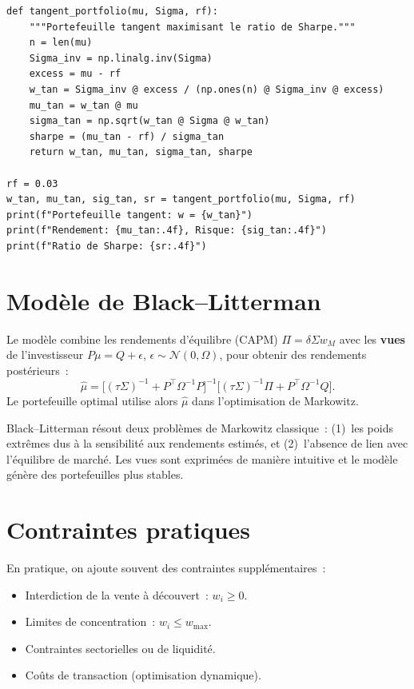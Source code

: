 \begin{codeblock}[title=\textbf{Portefeuille tangent (max Sharpe)}]
\begin{verbatim}
def tangent_portfolio(mu, Sigma, rf):
    """Portefeuille tangent maximisant le ratio de Sharpe."""
    n = len(mu)
    Sigma_inv = np.linalg.inv(Sigma)
    excess = mu - rf
    w_tan = Sigma_inv @ excess / (np.ones(n) @ Sigma_inv @ excess)
    mu_tan = w_tan @ mu
    sigma_tan = np.sqrt(w_tan @ Sigma @ w_tan)
    sharpe = (mu_tan - rf) / sigma_tan
    return w_tan, mu_tan, sigma_tan, sharpe

rf = 0.03
w_tan, mu_tan, sig_tan, sr = tangent_portfolio(mu, Sigma, rf)
print(f"Portefeuille tangent: w = {w_tan}")
print(f"Rendement: {mu_tan:.4f}, Risque: {sig_tan:.4f}")
print(f"Ratio de Sharpe: {sr:.4f}")
\end{verbatim}
\end{codeblock}

\section{Mod\`ele de Black--Litterman}

\begin{definition}
Le mod\`ele combine les rendements d'\'equilibre (CAPM) $\Pi = \delta\Sigma w_M$
avec les \textbf{vues} de l'investisseur $P\mu = Q + \epsilon$,
$\epsilon \sim \mathcal{N}(0, \Omega)$, pour obtenir des rendements
post\'erieurs~:
\[
    \hat{\mu} = \bigl[(\tau\Sigma)^{-1} + P^\top\Omega^{-1}P\bigr]^{-1}
    \bigl[(\tau\Sigma)^{-1}\Pi + P^\top\Omega^{-1}Q\bigr].
\]
Le portefeuille optimal utilise alors $\hat{\mu}$ dans l'optimisation
de Markowitz.
\end{definition}

\begin{intuition}[title=\textbf{Avantage de Black--Litterman}]
Black--Litterman r\'esout deux probl\`emes de Markowitz classique~:
(1)~les poids extr\^emes dus \`a la sensibilit\'e aux rendements
estim\'es, et (2)~l'absence de lien avec l'\'equilibre de march\'e.
Les vues sont exprim\'ees de mani\`ere intuitive et le mod\`ele
g\'en\`ere des portefeuilles plus stables.
\end{intuition}

\section{Contraintes pratiques}

\begin{remarque}
En pratique, on ajoute souvent des contraintes suppl\'ementaires~:
\begin{itemize}
    \item Interdiction de la vente \`a d\'ecouvert~: $w_i \geq 0$.
    \item Limites de concentration~: $w_i \leq w_{\max}$.
    \item Contraintes sectorielles ou de liquidit\'e.
    \item Co\^uts de transaction (optimisation dynamique).
\end{itemize}
\end{remarque}

